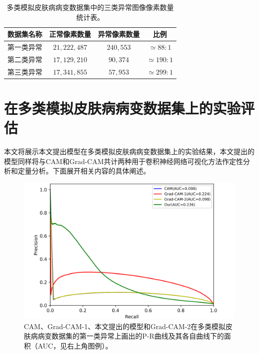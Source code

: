 \begin{table}[h]
	\centering
	\caption{多类模拟皮肤病病变数据集中的三类异常图像像素数量统计表。}
	\label{tab:multi_ds_pixel_freqs}
	\begin{tabular}{c|c|c|c}
		\toprule[2pt]
		数据集名称 & 正常像素数量 & 异常像素数量 & 比例 \\
		\midrule[2pt]
		第一类异常&  $21,222,487$ & $240,553$ & $\simeq 88: 1$ \\ \hline
		第二类异常&  $17,129,210$ & $90,374$ & $\simeq 190: 1$ \\ \hline
		第三类异常 & $17,341,855$ & $57,953$ & $\simeq 299: 1$ \\
		\bottomrule[2pt]
	\end{tabular}
\end{table}

\section{在多类模拟皮肤病病变数据集上的实验评估}\label{sec:multi_classes_experiments_res}
本文将展示本文提出模型在多类模拟皮肤病病变数据集上的实验结果，本文提出的模型同样将与CAM和Grad-CAM共计两种用于卷积神经网络可视化方法作定性分析和定量分析。下面展开相关内容的具体阐述。

\begin{figure}[H]
	\centering
	\includegraphics[width=1.0\textwidth]{figure/pr_curve_multi_skin/IMAGE_NET_pr_curve.png}
	\caption{CAM、Grad-CAM-1、本文提出的模型和Grad-CAM-2在多类模拟皮肤病病变数据集的第一类异常上画出的P-R曲线及其各自曲线下的面积（AUC，见右上角图例）。} 
	\label{fig:multi_simulate_pr_curve_image_net}
\end{figure}

